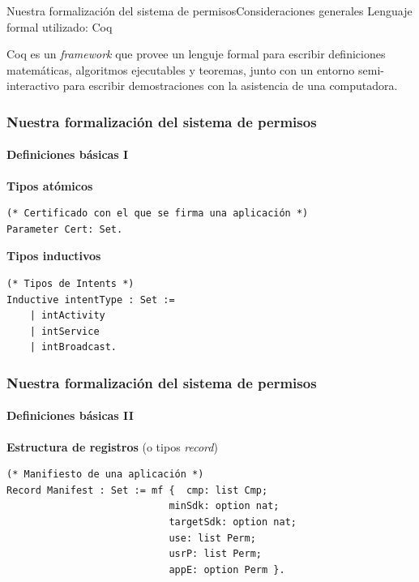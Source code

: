 \documentclass[pdf, handout]{beamer} %
\begin{document}
\begin{frame}{Nuestra formalización del sistema de permisos}{Consideraciones generales}
    Lenguaje formal utilizado: Coq
    \vspace{10px}
    \begin{block}{}
        Coq es un \textit{framework} que provee un lenguje formal para escribir definiciones
        matemáticas, algoritmos ejecutables y teoremas, junto con un entorno semi-interactivo para
        escribir demostraciones con la asistencia de una computadora.
    \end{block}
\end{frame}

\begin{frame}[fragile]
    \frametitle{Nuestra formalización del sistema de permisos}
    \framesubtitle{Definiciones básicas I}
    \textbf{Tipos atómicos}
    \begin{verbatim}
(* Certificado con el que se firma una aplicación *)
Parameter Cert: Set.
    \end{verbatim}
    \pause

    \textbf{Tipos inductivos}
    \begin{verbatim}
(* Tipos de Intents *)
Inductive intentType : Set :=
    | intActivity
    | intService
    | intBroadcast.
    \end{verbatim}
\end{frame}

\begin{frame}[fragile]
    \frametitle{Nuestra formalización del sistema de permisos}
    \framesubtitle{Definiciones básicas II}
    \textbf{Estructura de registros} (o tipos \textit{record})
    \begin{verbatim}
(* Manifiesto de una aplicación *)
Record Manifest : Set := mf {  cmp: list Cmp;
                            minSdk: option nat;
                            targetSdk: option nat;
                            use: list Perm;
                            usrP: list Perm; 
                            appE: option Perm }.
    \end{verbatim}
\end{frame}
\end{document}
